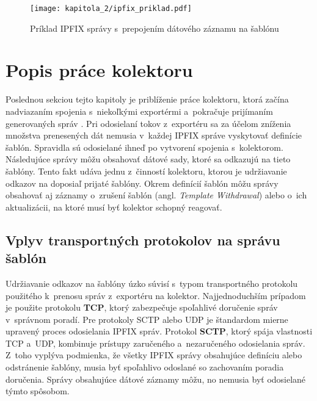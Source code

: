 \begin{figure*}[ht]
    \centering
    \texttt{[image: kapitola\_2/ipfix\_priklad.pdf]}
    \caption{Príklad IPFIX správy s~prepojením dátového záznamu na šablónu}
    \label{ipfix_priklad}
\end{figure*}


\section{Popis práce kolektoru}
\label{sec:collector_overview}

Poslednou sekciou tejto kapitoly je priblíženie práce kolektoru, ktorá začína nadviazaním spojenia s~niekoľkými exportérmi a~pokračuje prijímaním generovaných správ \cite{rfc5153}. Pri odosielaní tokov z~exportéru sa za účelom zníženia množstva prenesených dát
nemusia v~každej IPFIX správe vyskytovať definície šablón. Spravidla sú odosielané ihneď po vytvorení spojenia s~kolektorom. Následujúce správy môžu obsahovať dátové sady, ktoré sa odkazujú na tieto šablóny. Tento fakt udáva jednu z~činností kolektoru, ktorou je udržiavanie
odkazov na doposiaľ prijaté šablóny. Okrem definícií šablón môžu správy obsahovať aj záznamy o~zrušení šablón (angl. \textit{Template Withdrawal}) alebo o~ich aktualizácii, na ktoré musí byť kolektor schopný reagovať.

\subsection*{Vplyv transportných protokolov na správu šablón}

Udržiavanie odkazov na šablóny úzko súvisí s~typom transportného protokolu použitého k~prenosu správ z~exportéru na kolektor. Najjednoduchším prípadom je použite protokolu \textbf{TCP}, ktorý zabezpečuje spoľahlivé doručenie správ v~správnom poradí. Pre protokoly
SCTP alebo UDP je štandardom \cite{rfc5153} mierne upravený proces odosielania IPFIX správ. Protokol \textbf{SCTP}, ktorý spája vlastnosti TCP a~UDP, kombinuje prístupy zaručeného a~nezaručeného odosielania správ. Z~toho vyplýva podmienka, že všetky IPFIX správy obsahujúce
definíciu alebo odstránenie šablóny, musia byť spoľahlivo odoslané so zachovaním poradia doručenia. Správy obsahujúce dátové záznamy môžu, no nemusia byť odosielané týmto spôsobom.

